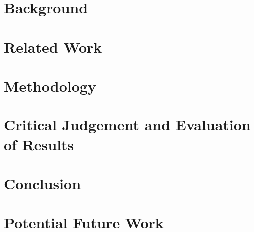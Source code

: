 \documentclass{article}
\begin{document}
\section{Background}
\pagebreak
\section{Related Work}
\pagebreak
\section{Methodology}
\pagebreak
\section{Critical Judgement and Evaluation of Results}
\pagebreak
\section{Conclusion}
\pagebreak
\section{Potential Future Work}
\pagebreak
\end{document}
